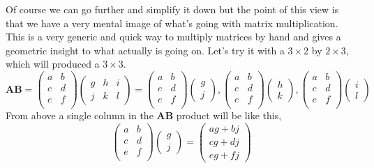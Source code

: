 Of course we can go further and simplify it down but the point of this view is that we have a very mental image of what's going with matrix multiplication. This is a very generic and quick way to multiply matrices by hand and gives a geometric insight to what actually is going on. Let's try it with a $3\times2$ by $2\times3$, which will produced a $3\times3$.
\begin{equation*}
	\mathbf{AB} = \begin{pmatrix}
		a & b \\ 
		c & d \\ 
		e & f \\ 
	\end{pmatrix}\begin{pmatrix}
		g & h & i \\
		j & k & l 
	\end{pmatrix} = 
	\begin{pmatrix*}
	a & b \\ 
	c & d \\ 
	e & f \\ 
	\end{pmatrix*}\begin{pmatrix*}
	g \\ j 
	\end{pmatrix*}, 
	\begin{pmatrix*}
	a & b \\ 
	c & d \\ 
	e & f \\ 
	\end{pmatrix*}\begin{pmatrix*}
	h \\ k 
	\end{pmatrix*},
	\begin{pmatrix*}
	a & b \\ 
	c & d \\ 
	e & f \\ 
	\end{pmatrix*}\begin{pmatrix*}
	i \\ l
	\end{pmatrix*} 
\end{equation*}
From above a single column in the \textbf{AB} product will be like this,
\begin{equation*}
	\begin{pmatrix*}
	a & b \\ 
	c & d \\ 
	e & f \\ 
	\end{pmatrix*}\begin{pmatrix*}
	g \\ j 
	\end{pmatrix*} = \begin{pmatrix*}
	ag + bj \\ 
	cg + dj \\ 
	eg + fj 
 	\end{pmatrix*}
\end{equation*}

